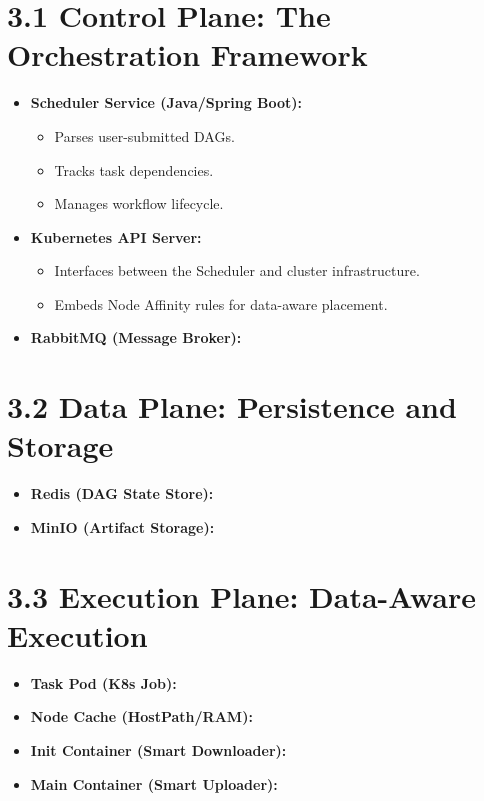 \documentclass[12pt,a4paper]{report}
\begin{document}

\section*{3.1 Control Plane: The Orchestration Framework}
\begin{itemize}
    \item \textbf{Scheduler Service (Java/Spring Boot):}
    \begin{itemize}
        \item Parses user-submitted DAGs.
        \item Tracks task dependencies.
        \item Manages workflow lifecycle.
    \end{itemize}
    \item \textbf{Kubernetes API Server:}
    \begin{itemize}
        \item Interfaces between the Scheduler and cluster infrastructure.
        \item Embeds Node Affinity rules for data-aware placement.
    \end{itemize}
    \item \textbf{RabbitMQ (Message Broker):}
\end{itemize}

\section*{3.2 Data Plane: Persistence and Storage}
\begin{itemize}
    \item \textbf{Redis (DAG State Store):}
    \item \textbf{MinIO (Artifact Storage):}
\end{itemize}

\section*{3.3 Execution Plane: Data-Aware Execution}
\begin{itemize}
    \item \textbf{Task Pod (K8s Job):}
    \item \textbf{Node Cache (HostPath/RAM):}
    \item \textbf{Init Container (Smart Downloader):}
    \item \textbf{Main Container (Smart Uploader):}
\end{itemize}
\end{document}
